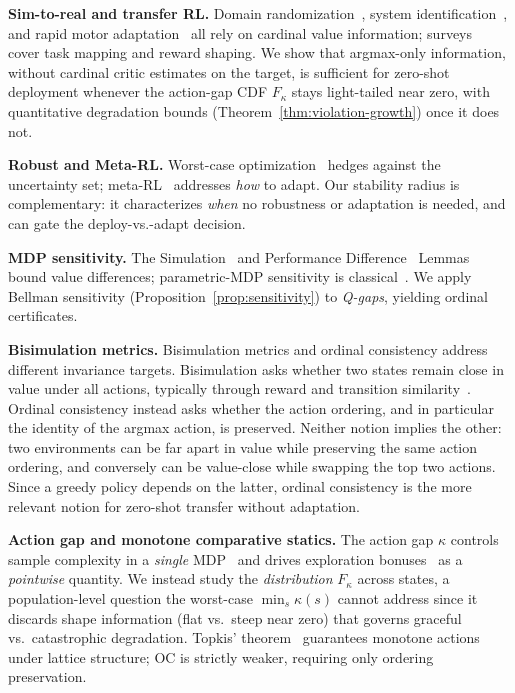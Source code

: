 \documentclass{article}
\begin{document}
\textbf{Sim-to-real and transfer RL.} Domain randomization~\citep{tobin2017domain, peng2018sim, openai2019solving, mehta2020active}, system identification~\citep{ljung1998system, yu2017preparing, yu2019sim}, and rapid motor adaptation~\citep{kumar2021rma} all rely on cardinal value information; surveys~\citep{taylor2009transfer} cover task mapping and reward shaping. We show that argmax-only information, without cardinal critic estimates on the target, is sufficient for zero-shot deployment whenever the action-gap CDF $F_\kappa$ stays light-tailed near zero, with quantitative degradation bounds (Theorem~\ref{thm:violation-growth}) once it does not.

\textbf{Robust and Meta-RL.} Worst-case optimization~\citep{iyengar2005robust, nilim2005robust, panaganti2022robust} hedges against the uncertainty set; meta-RL~\citep{finn2017model, rakelly2019efficient, duan2016rl2} addresses \emph{how} to adapt. Our stability radius is complementary: it characterizes \emph{when} no robustness or adaptation is needed, and can gate the deploy-vs.-adapt decision.

\textbf{MDP sensitivity.} The Simulation~\citep{kearns2002near} and Performance Difference~\citep{kakade2002approximately, schulman2015trust} Lemmas bound value differences; parametric-MDP sensitivity is classical~\citep{schweitzer1968perturbation, cao2007stochastic}. We apply Bellman sensitivity (Proposition~\ref{prop:sensitivity}) to \emph{Q-gaps}, yielding ordinal certificates.

\textbf{Bisimulation metrics.} Bisimulation metrics and ordinal consistency address different invariance targets. Bisimulation asks whether two states remain close in value under all actions, typically through reward and transition similarity~\citep{ferns2004metrics, castro2020scalable}. Ordinal consistency instead asks whether the action ordering, and in particular the identity of the argmax action, is preserved. Neither notion implies the other: two environments can be far apart in value while preserving the same action ordering, and conversely can be value-close while swapping the top two actions. Since a greedy policy depends on the latter, ordinal consistency is the more relevant notion for zero-shot transfer without adaptation.

\textbf{Action gap and monotone comparative statics.} The action gap $\kappa$ controls sample complexity in a \emph{single} MDP~\citep{farahmand2011action} and drives exploration bonuses~\citep{bellemare2016increasing} as a \emph{pointwise} quantity. We instead study the \emph{distribution} $F_\kappa$ across states, a population-level question the worst-case $\min_s \kappa(s)$ cannot address since it discards shape information (flat vs.\ steep near zero) that governs graceful vs.\ catastrophic degradation. Topkis' theorem~\citep{topkis1998supermodularity, milgrom1994monotone} guarantees monotone actions under lattice structure; OC is strictly weaker, requiring only ordering preservation.
\end{document}
